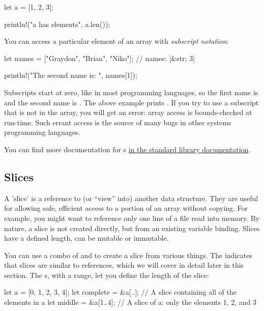 \begin{rustc}
let a = [1, 2, 3];

println!("a has {} elements", a.len());
\end{rustc}

You can access a particular element of an array with \emph{subscript notation}:

\begin{rustc}
let names = ["Graydon", "Brian", "Niko"]; // names: [&str; 3]

println!("The second name is: {}", names[1]);
\end{rustc}

Subscripts start at zero, like in most programming languages, so the first name is  and the second name is .
The above example prints . If you try to use a subscript that is not in the array, you will get an error:
array access is bounds-checked at run-time. Such errant access is the source of many bugs in other systems programming languages.

\blank

You can find more documentation for s \href{https://doc.rust-lang.org/std/primitive.array.html}{in the standard library
documentation}.

\subsection*{Slices}

A 'slice' is a reference to (or “view” into) another data structure. They are useful for allowing safe, efficient access to a portion 
of an array without copying. For example, you might want to reference only one line of a file read into memory. By nature, a slice is 
not created directly, but from an existing variable binding. Slices have a defined length, can be mutable or immutable.


You can use a combo of \code{\&} and \code{[]} to create a slice from various things. The \code{\&} indicates that slices are similar 
to references, which we will cover in detail later in this section. The \code{[]}s, with a range, let you define the length of the slice:

\begin{rustc}
let a = [0, 1, 2, 3, 4];
let complete = &a[..]; // A slice containing all of the elements in a
let middle = &a[1..4]; // A slice of a: only the elements 1, 2, and 3
\end{rustc}


